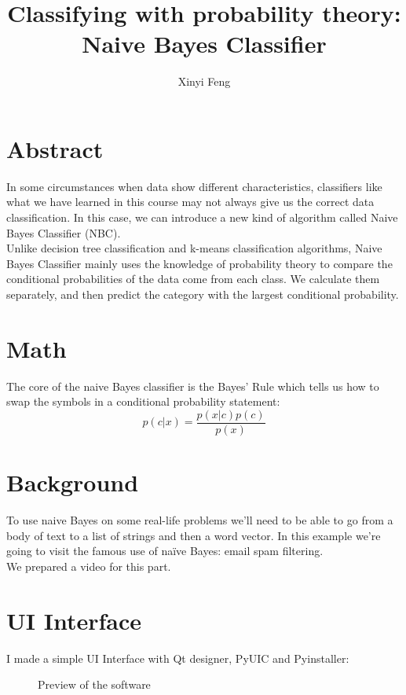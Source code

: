 \documentclass[11pt,a4paper]{article}
\title{Classifying with probability theory: Naive Bayes Classifier}
\author[a]{Xinyi Feng}
\affil[a]{xfeng82@wisc.edu}
\date{}
\begin{document}
  \maketitle
  
\section{Abstract}
In some circumstances when data show different characteristics, classifiers
like what we have learned in this course may not always give us the correct
data classification. In this case, we can introduce a new kind of algorithm
called Naive Bayes Classifier (NBC).\\
Unlike decision tree classification and k-means classification algorithms, Naive Bayes Classifier mainly uses the knowledge of probability theory to compare the conditional probabilities of the data come from each class. We calculate them separately, and then predict the category with the largest conditional probability. 

\section{Math}
The core of the naive Bayes classifier is the Bayes' Rule which tells us how to swap the symbols in a conditional probability statement:
\begin{equation}
p(c|x)=\frac{p(x|c)p(c)}{p(x)}
\end{equation}
\section{Background}

To use naive Bayes on some real-life problems we’ll need to be able to go from a body of text to a list of strings and then a word vector. In this example we’re going to visit the famous use of naïve Bayes: email spam filtering.\\
We prepared a video for this part.

\section{UI Interface}
I made a simple UI Interface with Qt designer, PyUIC and Pyinstaller:\\
\begin{figure}[H]
\centering 
{}
\caption{Preview of the software}
\label{Fig.main}
\end{figure}
\end{document}
